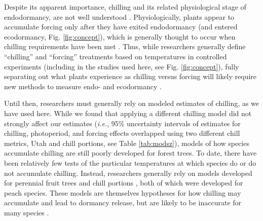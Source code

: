 \documentclass{article}
\newcommand{\R}[1]{\label{#1}\linelabel{#1}}
\begin{document}
\par Despite its apparent importance, chilling and its related physiological stage of endodormancy, are not well understood \emph{\citep{chuine2016}}. Physiologically, plants appear to accumulate forcing only after they have exited endodormancy (and entered ecodormancy, Fig. \ref{fig:concept}), which is generally thought to occur when chilling requirements have been met \emph{\citep{chuine2016}}. \R{whatchillstart}Thus, while researchers generally define ``chilling'' and ``forcing'' treatments based on temperatures in controlled experiments \R{ee7} (including in the studies used here, see Fig. \ref{fig:concept}), fully separating out what plants experience as chilling versus forcing will likely require new methods to measure endo- and ecodormancy \emph{\citep{vanderschoot2014}}. \R{whatchillend}

\par Until then, researchers must generally rely on modeled estimates of chilling, as we have used here. While we found that applying a different chilling model did not strongly affect our estimates (\emph{i.e.}, 95\% uncertainty intervals of estimates for chilling, photoperiod, and forcing effects overlapped using two different chill metrics, Utah and chill portions, see Table \ref{tab:modsz}), models of how species accumulate chilling are still poorly developed for forest trees. To date, there have been relatively few tests of the particular temperatures at which species do or do not accumulate chilling. Instead, researchers generally rely on models developed for perennial fruit trees \emph{\citep[i.e.,][]{richardson1974}} and chill portions \emph{\citep{fishman1987}}, both of which were developed for peach species. These models are themselves hypotheses for how chilling may accumulate and lead to dormancy release, but are likely to be inaccurate for many species \emph{\citep{dennis2003}}. 
\end{document}
